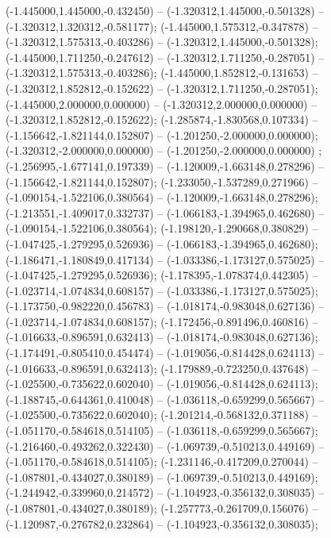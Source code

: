  (-1.445000,1.445000,-0.432450) -- (-1.320312,1.445000,-0.501328) -- (-1.320312,1.320312,-0.581177);
 (-1.445000,1.575312,-0.347878) -- (-1.320312,1.575313,-0.403286) -- (-1.320312,1.445000,-0.501328);
 (-1.445000,1.711250,-0.247612) -- (-1.320312,1.711250,-0.287051) -- (-1.320312,1.575313,-0.403286);
 (-1.445000,1.852812,-0.131653) -- (-1.320312,1.852812,-0.152622) -- (-1.320312,1.711250,-0.287051);
 (-1.445000,2.000000,0.000000) -- (-1.320312,2.000000,0.000000) -- (-1.320312,1.852812,-0.152622);
 (-1.285874,-1.830568,0.107334) -- (-1.156642,-1.821144,0.152807) -- (-1.201250,-2.000000,0.000000);
 (-1.320312,-2.000000,0.000000) -- (-1.201250,-2.000000,0.000000) ;
 (-1.256995,-1.677141,0.197339) -- (-1.120009,-1.663148,0.278296) -- (-1.156642,-1.821144,0.152807);
 (-1.233050,-1.537289,0.271966) -- (-1.090154,-1.522106,0.380564) -- (-1.120009,-1.663148,0.278296);
 (-1.213551,-1.409017,0.332737) -- (-1.066183,-1.394965,0.462680) -- (-1.090154,-1.522106,0.380564);
 (-1.198120,-1.290668,0.380829) -- (-1.047425,-1.279295,0.526936) -- (-1.066183,-1.394965,0.462680);
 (-1.186471,-1.180849,0.417134) -- (-1.033386,-1.173127,0.575025) -- (-1.047425,-1.279295,0.526936);
 (-1.178395,-1.078374,0.442305) -- (-1.023714,-1.074834,0.608157) -- (-1.033386,-1.173127,0.575025);
 (-1.173750,-0.982220,0.456783) -- (-1.018174,-0.983048,0.627136) -- (-1.023714,-1.074834,0.608157);
 (-1.172456,-0.891496,0.460816) -- (-1.016633,-0.896591,0.632413) -- (-1.018174,-0.983048,0.627136);
 (-1.174491,-0.805410,0.454474) -- (-1.019056,-0.814428,0.624113) -- (-1.016633,-0.896591,0.632413);
 (-1.179889,-0.723250,0.437648) -- (-1.025500,-0.735622,0.602040) -- (-1.019056,-0.814428,0.624113);
 (-1.188745,-0.644361,0.410048) -- (-1.036118,-0.659299,0.565667) -- (-1.025500,-0.735622,0.602040);
 (-1.201214,-0.568132,0.371188) -- (-1.051170,-0.584618,0.514105) -- (-1.036118,-0.659299,0.565667);
 (-1.216460,-0.493262,0.322430) -- (-1.069739,-0.510213,0.449169) -- (-1.051170,-0.584618,0.514105);
 (-1.231146,-0.417209,0.270044) -- (-1.087801,-0.434027,0.380189) -- (-1.069739,-0.510213,0.449169);
 (-1.244942,-0.339960,0.214572) -- (-1.104923,-0.356132,0.308035) -- (-1.087801,-0.434027,0.380189);
 (-1.257773,-0.261709,0.156076) -- (-1.120987,-0.276782,0.232864) -- (-1.104923,-0.356132,0.308035);
